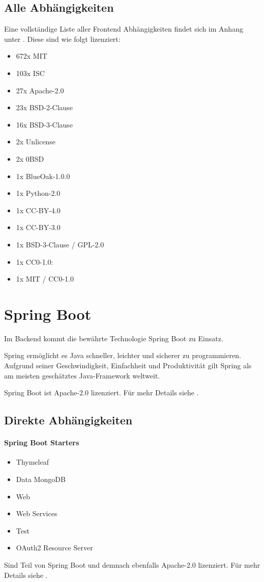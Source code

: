 \subsection{Alle Abhängigkeiten}
Eine vollständige Liste aller Frontend Abhängigkeiten findet sich im Anhang unter .
Diese sind wie folgt lizenziert:
\begin{itemize}
    \item 672x MIT
    \item 103x ISC
    \item 27x Apache-2.0
    \item 23x BSD-2-Clause
    \item 16x BSD-3-Clause
    \item 2x Unlicense
    \item 2x 0BSD
    \item 1x BlueOak-1.0.0
    \item 1x Python-2.0
    \item 1x CC-BY-4.0
    \item 1x CC-BY-3.0
    \item 1x BSD-3-Clause / GPL-2.0
    \item 1x CC0-1.0:
    \item 1x MIT / CC0-1.0
\end{itemize}



\section{Spring Boot}\label{sec:spring-boot}

Im Backend kommt die bewährte Technologie Spring Boot zu Einsatz.

Spring ermöglicht es Java schneller, leichter und sicherer zu programmieren.
Aufgrund seiner Geschwindigkeit, Einfachheit und Produktivität gilt Spring als am meisten geschätztes Java-Framework weltweit.
\cite{about-springboot}

Spring Boot ist Apache-2.0 lizenziert.
Für mehr Details siehe .

\subsection{Direkte Abhängigkeiten}\label{subsec:direkte-abhanigkeiten}

\paragraph{Spring Boot Starters}
\begin{itemize}
    \item Thymeleaf
    \item Data MongoDB
    \item Web
    \item Web Services
    \item Test
    \item OAuth2 Resource Server
\end{itemize}
Sind Teil von Spring Boot und demnach ebenfalls Apache-2.0 lizenziert.
Für mehr Details siehe .

